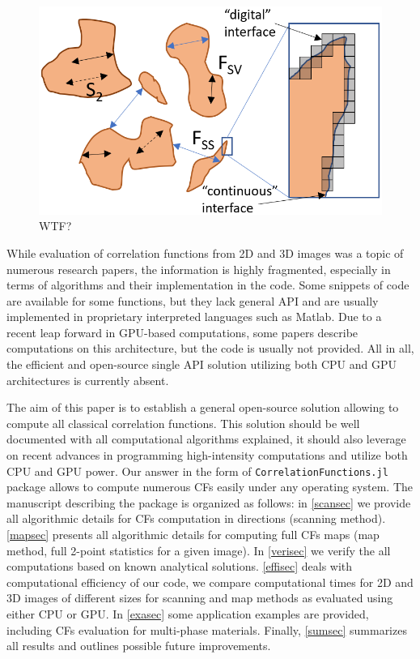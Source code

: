 \documentclass[reprint,amsmath,amssymb,aps,pre,nofootinbib]{revtex4-1}
\newcommand{\code}[1]{\colorbox{light-gray}{\texttt{#1}}}
\begin{document}
\begin{figure}[ht]
  \centering
  \includegraphics[width=0.9\linewidth]{images/corr.png}
  \caption[]{WTF?}
  \label{fig:functions}
\end{figure}

While evaluation of correlation functions from 2D and 3D images was a topic of
numerous research papers, the information is highly fragmented, especially in
terms of algorithms and their implementation in the code. Some snippets of code
are available for some functions, but they lack general API and are usually
implemented in proprietary interpreted languages such as Matlab. Due to a recent
leap forward in GPU-based computations, some papers describe computations on
this architecture, but the code is usually not provided. All in all, the
efficient and open-source single API solution utilizing both CPU and GPU
architectures is currently absent.

The aim of this paper is to establish a general open-source solution allowing to
compute all classical correlation functions. This solution should be well
documented with all computational algorithms explained, it should also leverage
on recent advances in programming high-intensity computations and utilize both
CPU and GPU power. Our answer in the form of \code{CorrelationFunctions.jl}
package allows to compute numerous CFs easily under any operating system. The
manuscript describing the package is organized as follows: in \cref{scansec} we
provide all algorithmic details for CFs computation in directions (scanning
method). \cref{mapsec} presents all algorithmic details for computing full CFs
maps (map method, full 2-point statistics for a given image). In \cref{verisec}
we verify the all computations based on known analytical
solutions. \cref{effisec} deals with computational efficiency of our code, we
compare computational times for 2D and 3D images of different sizes for scanning
and map methods as evaluated using either CPU or GPU. In \cref{exasec} some
application examples are provided, including CFs evaluation for multi-phase
materials. Finally, \cref{sumsec} summarizes all results and outlines possible
future improvements.
\end{document}
